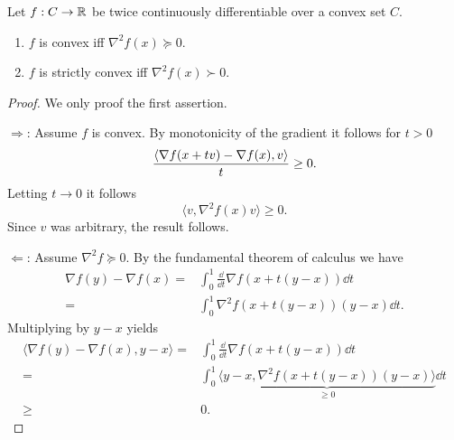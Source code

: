 \begin{theorem}
    Let $f:C\rightarrow \mathbb{R}$ be twice continuously differentiable over a convex set $C$. 
    \begin{enumerate}
        \item $f$ is convex iff $\nabla^2 f(x)\succeq 0$.
        \item $f$ is strictly convex iff $\nabla^2 f(x)\succ 0$.
    \end{enumerate}
\end{theorem}
\begin{proof}
    We only proof the first assertion.

    $\Rightarrow$: Assume $f$ is convex. By monotonicity of the gradient it follows for $t>0$
    \begin{equation}
        \frac{\left\langle\nabla f(x+tv)-\nabla f(x) , v\right\rangle}{t}\geq 0.
    \end{equation}
    Letting $t\rightarrow 0$ it follows 
    \begin{equation}
        \langle v, \nabla^2 f(x)v\rangle\geq 0.
    \end{equation}
    Since $v$ was arbitrary, the result follows.

    $\Leftarrow$: Assume $\nabla^2 f\succeq 0$. By the fundamental theorem of calculus we have
    \begin{equation}
        \begin{aligned}
            \nabla f(y) - \nabla f(x)
            =& \int_0^1 \frac{\dd}{\dd t} \nabla f(x+t(y-x))\dd t\\
            =& \int_0^1 \nabla^2 f(x+t(y-x))(y-x)\dd t.
        \end{aligned}
    \end{equation}
    Multiplying by $y-x$ yields
    \begin{equation}
        \begin{aligned}
            \langle \nabla f(y) - \nabla f(x),y-x\rangle
            =& \int_0^1 \frac{\dd}{\dd t} \nabla f(x+t(y-x))\dd t\\
            =& \int_0^1 \underbrace{\langle y-x,\nabla^2 f(x+t(y-x))(y-x)\rangle}_{\geq 0}\dd t\\
            \geq& 0.
        \end{aligned}
    \end{equation}
\end{proof}


